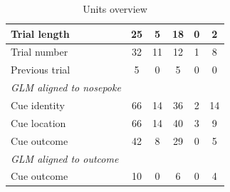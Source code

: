 \documentclass[11pt]{article}
\begin{document}
{\begin{table}[p]
\begin{tabular}{l c  c c c c}
\hline
\hspace{6mm}Trial length       & 25        & 5          & 18         & 0         & 2\\
\hline
\hspace{6mm}Trial number       & 32         & 11          & 12         & 1          & 8\\
\hline
\hspace{6mm}Previous trial       & 5         & 0          &5          & 0          & 0\\
\hline
\hspace{3mm}\textit{GLM aligned to nosepoke}                       &         &       &          &          &\\
\hline
\hspace{6mm}Cue identity       & 66         &14          & 36          & 2          &14\\
\hline
\hspace{6mm}Cue location       & 66         &14          & 40          & 3          & 9\\
\hline
\hspace{6mm}Cue outcome       & 42        & 8          & 29        & 0          & 5\\
\hline
\hspace{3mm}\textit{GLM aligned to outcome}                       &         &       &          &          &\\
\hline
\hspace{6mm}Cue outcome       & 10        & 0          & 6       & 0          &4\\
\hline

\end{tabular}
\caption {Units overview} \label{tbl1} 
\end{table}

}
\end{document}
